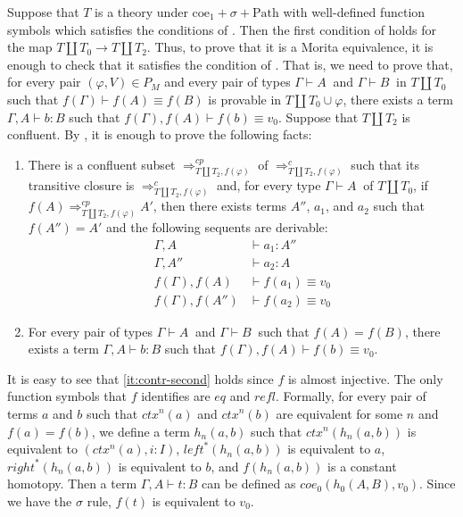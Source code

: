 \documentclass[reqno]{amsart}
\theoremstyle{definition}
\theoremstyle{remark}
\newcommand{\deq}{\equiv}
\newcommand{\type}{}
\newcommand{\coeT}{\mathrm{coe}}
\newcommand{\PathT}{\mathrm{Path}}
\newcommand{\Ceq}{\mathit{eq}}
\newcommand{\leftI}{\mathit{left}}
\newcommand{\rightI}{\mathit{right}}
\newcommand{\coe}{\mathit{coe}}
\newcommand{\refl}{\mathit{refl}}
\newcommand{\ctx}{\mathit{ctx}}
\numberwithin{figure}{section}
\begin{document}
Suppose that $T$ is a theory under $\coeT_1 + \sigma + \PathT$ with well-defined function symbols which satisfies the conditions of .
Then the first condition of  holds for the map $T \amalg T_0 \to T \amalg T_2$.
Thus, to prove that it is a Morita equivalence, it is enough to check that it satisfies the condition of .
That is, we need to prove that, for every pair $(\varphi,V) \in P_M$ and every pair of types $\Gamma \vdash A\ \type$ and $\Gamma \vdash B\ \type$ in $T \amalg T_0$ such that $f(\Gamma) \vdash f(A) \deq f(B)$ is provable in $T \amalg T_0 \cup \varphi$,
there exists a term $\Gamma, A \vdash b : B$ such that $f(\Gamma), f(A) \vdash f(b) \deq v_0$.
Suppose that $T \amalg T_2$ is confluent.
By , it is enough to prove the following facts:
\begin{enumerate}
\item \label{it:contr-first} There is a confluent subset $\Rightarrow_{T \amalg T_2, f(\varphi)}^{cp}$ of $\Rightarrow_{T \amalg T_2, f(\varphi)}^c$ such that its transitive closure is $\Rightarrow_{T \amalg T_2, f(\varphi)}^c$ and,
for every type $\Gamma \vdash A\ \type$ of $T \amalg T_0$, if $f(A) \Rightarrow_{T \amalg T_2, f(\varphi)}^{cp} A'$, then there exists terms $A''$, $a_1$, and $a_2$ such that $f(A'') = A'$ and the following sequents are derivable:
\begin{align*}
\Gamma, A & \vdash a_1 : A'' \\
\Gamma, A'' & \vdash a_2 : A \\
f(\Gamma), f(A) & \vdash f(a_1) \deq v_0 \\
f(\Gamma), f(A'') & \vdash f(a_2) \deq v_0
\end{align*}
\item \label{it:contr-second} For every pair of types $\Gamma \vdash A\ \type$ and $\Gamma \vdash B\ \type$ such that $f(A) = f(B)$, there exists a term $\Gamma, A \vdash b : B$ such that $f(\Gamma), f(A) \vdash f(b) \deq v_0$.
\end{enumerate}

It is easy to see that \eqref{it:contr-second} holds since $f$ is almost injective.
The only function symbols that $f$ identifies are $\Ceq$ and $\refl$.
Formally, for every pair of terms $a$ and $b$ such that $\ctx^n(a)$ and $\ctx^n(b)$ are equivalent for some $n$ and $f(a) = f(b)$, 
we define a term $h_n(a,b)$ such that $\ctx^n(h_n(a,b))$ is equivalent to $(\ctx^n(a), i : I)$, $\leftI^*(h_n(a,b))$ is equivalent to $a$, $\rightI^*(h_n(a,b))$ is equivalent to $b$, and $f(h_n(a,b))$ is a constant homotopy.
Then a term $\Gamma, A \vdash t : B$ can be defined as $\coe_0(h_0(A,B), v_0)$.
Since we have the $\sigma$ rule, $f(t)$ is equivalent to $v_0$.
\end{document}
